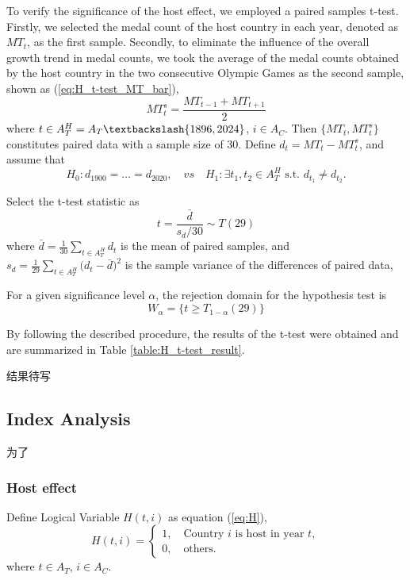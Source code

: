 \documentclass{mcmthesis}
\begin{document}
To verify the significance of the host effect, we employed a paired samples t-test. Firstly, we selected the medal count of the host country in each year, denoted as $MT_{t}$, as the first sample. Secondly, to eliminate the influence of the overall growth trend in medal counts, we took the average of the medal counts obtained by the host country in the two consecutive Olympic Games as the second sample, shown as (\ref{eq:H_t-test_MT_bar}),
\begin{equation}
MT^s_{t}=\frac{ MT_{t-1} + MT_{t+1} }{2}
\label{eq:H_t-test_MT_bar}
\end{equation}
where $t\in A_T^H = A_T \textbackslash \{1896,2024\}$, $i\in A_{C}$. Then $\{MT_{t},MT^s_{t}\}$ constitutes paired data with a sample size of 30. Define $d_t= MT_{t} - MT^s_{t}$, and assume that
\begin{equation*}
H_0: d_{1900}=\dots=d_{2020}, \quad vs \quad H_1:  \exists t_1, t_2\in A_T^H \text{ s.t. } d_{t_1}\ne d_{t_2}.
\end{equation*}

Select the t-test statistic as
\begin{equation}
t=\frac{ \bar{d} }{ s_d\slash 30 } \sim T(29)
\end{equation}
where $\bar{d}=\frac{1}{30} \sum_{t\in A_T^H} d_t$ is the mean of paired samples, 
and $ s_d = \frac{1}{29} \sum_{t\in A_T^H}\big( d_t - \bar{d} \big)^2 $ is the sample variance of the differences of paired data, 

For a given significance level $\alpha$, the rejection domain for the hypothesis test is
\begin{equation}
W_\alpha = \big\{ t \ge T_{1-\alpha}(29) \big\}
\end{equation}

By following the described procedure, the results of the t-test were obtained and are summarized in Table \ref{table:H_t-test_result}.

结果待写



\subsection{Index Analysis}
为了
\subsubsection{Host effect}

Define Logical Variable $H(t,i)$ as equation (\ref{eq:H}),
\begin{equation}
	H(t,i)=
	\begin{cases}
		1, \quad \text{Country } i \text{ is host in year } t, \\
		0, \quad \text{others}.
	\end{cases}
	\label{eq:H}
\end{equation}
where $t\in A_{T}$, $i\in A_{C}$.
\end{document}
